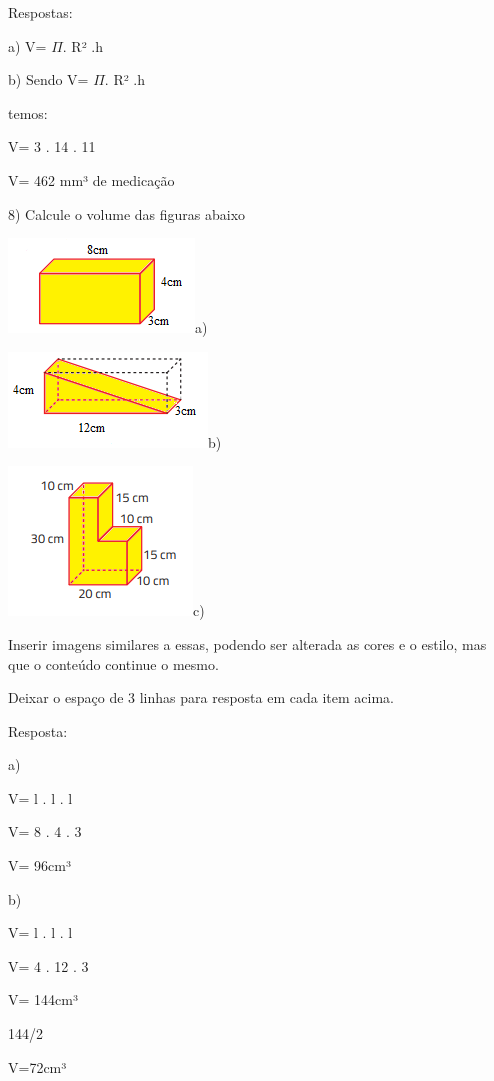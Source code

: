 {Respostas:

a) V= \(\Pi\). R² .h

b) Sendo V= \(\Pi\). R² .h

temos:

V= 3 . 14 . 11

V= 462 mm³ de medicação

8) Calcule o volume das figuras abaixo

\includegraphics[width=1.94792in,height=0.98958in]{./imgSAEB_8_MAT/media/image51.png}a)

\includegraphics[width=2.08333in,height=1in]{./imgSAEB_8_MAT/media/image52.png}b)

\includegraphics[width=1.92708in,height=1.5625in]{./imgSAEB_8_MAT/media/image53.png}c)

Inserir imagens similares a essas, podendo ser alterada as cores e o
estilo, mas que o conteúdo continue o mesmo.

Deixar o espaço de 3 linhas para resposta em cada item acima.

Resposta:

a)

V= l . l . l

V= 8 . 4 . 3

V= 96cm³

b)

V= l . l . l

V= 4 . 12 . 3

V= 144cm³

144/2

V=72cm³

}
